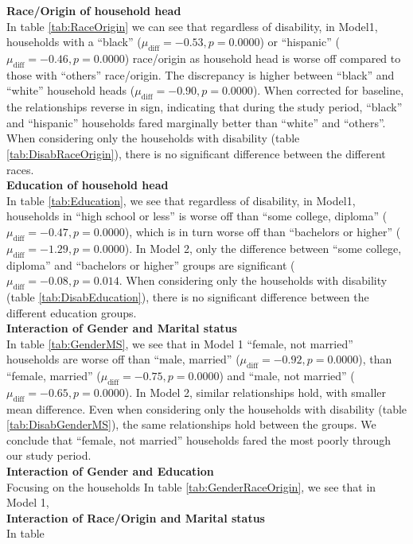 \documentclass[11pt]{extarticle} %
\begin{document}
\noindent
{\bf{Race/Origin of household head}} \\
In table \ref{tab:RaceOrigin} we can see that regardless of disability, in Model1, households with a ``black'' ($\mu_{\text{diff}} = -0.53, p = 0.0000$) or ``hispanic'' ($\mu_{\text{diff}} = -0.46, p = 0.0000$) race/origin as household head is worse off compared to those with ``others'' race/origin. The discrepancy is higher between ``black'' and ``white'' household heads ($\mu_{\text{diff}} = -0.90, p = 0.0000$). When corrected for baseline, the relationships reverse in sign, indicating that during the study period, ``black'' and ``hispanic'' households fared marginally better than ``white'' and ``others''. When considering only the households with disability (table \ref{tab:DisabRaceOrigin}), there is no significant difference between the different races. \\
\noindent
{\bf{Education of household head}} \\
In table \ref{tab:Education}, we see that regardless of disability, in Model1, households in ``high school or less'' is worse off than ``some college, diploma'' ($\mu_{\text{diff}} = -0.47, p = 0.0000$), which is in turn worse off than ``bachelors or higher'' ($\mu_{\text{diff}} = -1.29, p = 0.0000$). In Model 2, only the difference between ``some college, diploma'' and ``bachelors or higher'' groups are significant ($\mu_{\text{diff}} = -0.08, p = 0.014$. When considering only the households with disability (table \ref{tab:DisabEducation}), there is no significant difference between the different education groups. \\
\noindent
{\bf{Interaction of Gender and Marital status}} \\
In table \ref{tab:GenderMS}, we see that in Model 1 ``female, not married'' households are worse off than ``male, married'' ($\mu_{\text{diff}} = -0.92, p = 0.0000$), than ``female, married'' ($\mu_{\text{diff}} = -0.75, p = 0.0000$) and ``male, not married'' ($\mu_{\text{diff}} = -0.65, p = 0.0000$). In Model 2, similar relationships hold, with smaller mean difference. Even when considering only the households with disability (table \ref{tab:DisabGenderMS}), the same relationships hold between the groups. We conclude that ``female, not married'' households fared the most poorly through our study period. \\
\noindent
{\bf{Interaction of Gender and Education}} \\
Focusing on the households In table \ref{tab:GenderRaceOrigin}, we see that in Model 1,      \\
\noindent
{\bf{Interaction of Race/Origin and Marital status}} \\
In table \\
\end{document}
